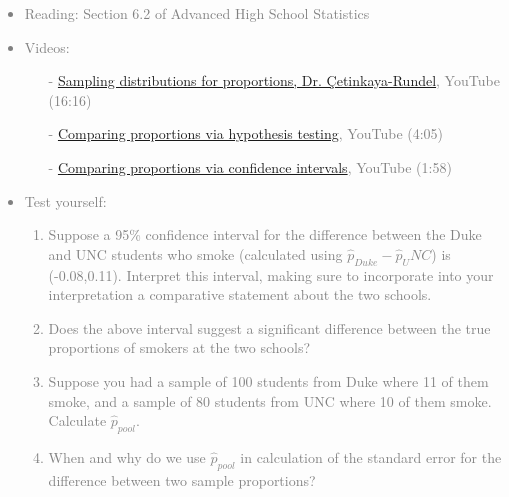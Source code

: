 \documentclass[11pt]{article}
\newcommand{\gray}[1]{\textcolor{gray}{#1}}
\begin{document}
\gray{
{\it
\vspace{-0.55cm}
\begin{itemize}
\renewcommand{\labelitemi}{{\textcolor{dark}{$\ast$}}}
\item Reading: Section 6.2 of Advanced High School Statistics
\item Videos:
\begin{itemize}
\item[-] \href{http://www.youtube.com/watch?v=_iFAZgpWsx0}{Sampling distributions for proportions, Dr. \c{C}etinkaya-Rundel}, YouTube (16:16)
\item[-] \href{http://www.youtube.com/watch?v=QaEjRSVG02E}{Comparing proportions via hypothesis testing}, YouTube (4:05)
\item[-] \href{http://www.youtube.com/watch?v=eAtCf0dM_VI}{Comparing proportions via confidence intervals}, YouTube (1:58)
\end{itemize}
\item Test yourself:
\begin{enumerate}
\item Suppose a 95\% confidence interval for the difference between the Duke and UNC students who smoke (calculated using $\hat{p}_{Duke} - \hat{p}_UNC$) is (-0.08,0.11). Interpret this interval, making sure to incorporate into your interpretation a comparative statement about the two schools.
\item Does the above interval suggest a significant difference between the true proportions of smokers at the two schools?
\item Suppose you had a sample of 100 students from Duke where 11 of them smoke, and a sample of 80 students from UNC where 10 of them smoke. Calculate $\hat{p}_{pool}$.
\item When and why do we use $\hat{p}_{pool}$ in calculation of the standard error for the difference between two sample proportions?
\end{enumerate}
\end{itemize}
}}


%

\vspace{0.48cm}

%
\end{document}
